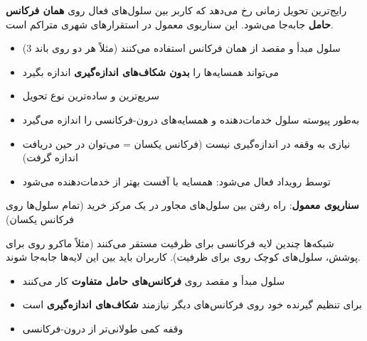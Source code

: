 




\CNchained{}

رایج‌ترین تحویل  زمانی رخ می‌دهد که کاربر بین سلول‌های فعال روی \textbf{همان فرکانس حامل} جابه‌جا می‌شود. این سناریوی معمول در استقرارهای شهری متراکم است.


\begin{itemize}
\tightlist
\item
  سلول مبدأ و مقصد از همان فرکانس استفاده می‌کنند (مثلاً هر دو روی  باند 3)
\item
   می‌تواند همسایه‌ها را \textbf{بدون شکاف‌های اندازه‌گیری} اندازه بگیرد
\item
  سریع‌ترین و ساده‌ترین نوع تحویل
\end{itemize}


\begin{itemize}
\tightlist
\item
   به‌طور پیوسته  سلول خدمات‌دهنده و همسایه‌های درون-فرکانسی را اندازه می‌گیرد
\item
  نیازی به وقفه در اندازه‌گیری نیست (فرکانس یکسان = می‌توان در حین دریافت اندازه گرفت)
\item
  توسط رویداد  فعال می‌شود: همسایه با آفست بهتر از خدمات‌دهنده می‌شود
\end{itemize}

\textbf{سناریوی معمول}: راه رفتن بین سلول‌های مجاور در یک مرکز خرید (تمام سلول‌ها روی فرکانس یکسان)



\CNchained{}

شبکه‌ها چندین لایه فرکانسی برای ظرفیت مستقر می‌کنند (مثلاً ماکرو روی  برای پوشش، سلول‌های کوچک روی  برای ظرفیت). کاربران باید بین این لایه‌ها جابه‌جا شوند.


\begin{itemize}
\tightlist
\item
  سلول مبدأ و مقصد روی \textbf{فرکانس‌های حامل متفاوت} کار می‌کنند
\item
   برای تنظیم گیرنده خود روی فرکانس‌های دیگر نیازمند \textbf{شکاف‌های اندازه‌گیری} است
\item
  وقفه کمی طولانی‌تر از درون-فرکانسی
\end{itemize}

